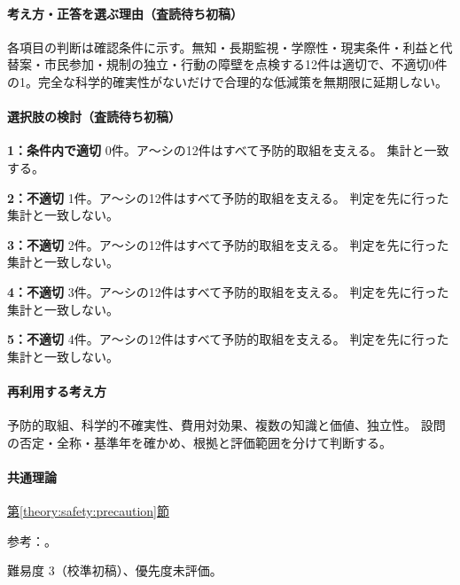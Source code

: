 \paragraph{考え方・正答を選ぶ理由（査読待ち初稿）} 各項目の判断は確認条件に示す。無知・長期監視・学際性・現実条件・利益と代替案・市民参加・規制の独立・行動の障壁を点検する12件は適切で、不適切0件の1。完全な科学的確実性がないだけで合理的な低減策を無期限に延期しない。

\paragraph{選択肢の検討（査読待ち初稿）}\mbox{}\par

\noindent\textbf{1：条件内で適切} 0件。ア〜シの12件はすべて予防的取組を支える。 集計と一致する。\par

\noindent\textbf{2：不適切} 1件。ア〜シの12件はすべて予防的取組を支える。 判定を先に行った集計と一致しない。\par

\noindent\textbf{3：不適切} 2件。ア〜シの12件はすべて予防的取組を支える。 判定を先に行った集計と一致しない。\par

\noindent\textbf{4：不適切} 3件。ア〜シの12件はすべて予防的取組を支える。 判定を先に行った集計と一致しない。\par

\noindent\textbf{5：不適切} 4件。ア〜シの12件はすべて予防的取組を支える。 判定を先に行った集計と一致しない。\par

\paragraph{再利用する考え方} 予防的取組、科学的不確実性、費用対効果、複数の知識と価値、独立性。 設問の否定・全称・基準年を確かめ、根拠と評価範囲を分けて判断する。

\paragraph{共通理論} \hyperref[theory:safety:precaution]{第\ref*{theory:safety:precaution}節}

\par 参考：\cite{eth54_eea,eth54_rio}。

\par 難易度 3（校準初稿）、優先度未評価。

